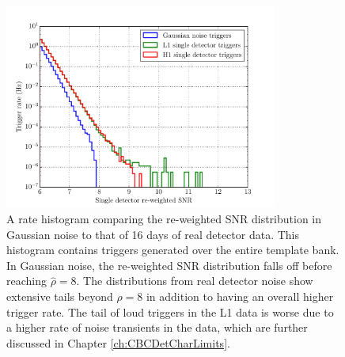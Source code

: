 \begin{figure}[ht!]%
\centering
  \includegraphics[width=0.8\textwidth]{figures/o1-cbc-dq-paper/H1-L1-Gaussian-newSNR-rate-hist}
  \caption[Rate histogram of PyCBC triggers vs. Gaussian noise]{A rate histogram %
           comparing the re-weighted SNR distribution in Gaussian %
           noise to that of 16 days of real detector data. This histogram contains %
           triggers generated over the entire template bank. In Gaussian noise, the re-weighted %
           SNR distribution falls off before reaching $\hat{\rho} = 8$. %
           The distributions from real detector noise show extensive tails beyond %
           $\hat{\rho} = 8$ in addition to having an overall higher trigger rate. %
           The tail of loud triggers in the L1 data is worse due to a higher rate of %
           noise transients in the data, which are further discussed in Chapter %
           \ref{ch:CBCDetCharLimits}.}
\label{fig:gaussian-rate}
\end{figure}



